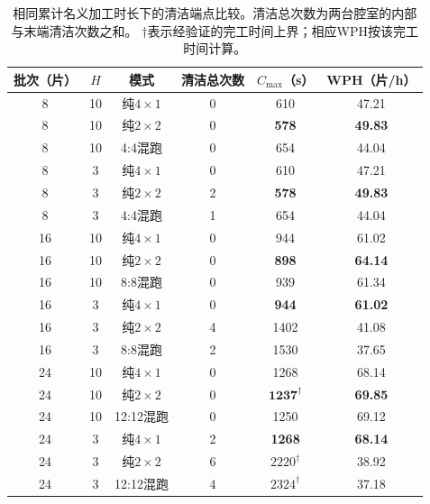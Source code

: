 \documentclass[final,5p,times,twocolumn]{elsarticle}
\begin{document}
\begin{table}[!htbp]
\centering
\scriptsize
\setlength{\tabcolsep}{4pt}
\caption{相同累计名义加工时长下的清洁端点比较。清洁总次数为两台腔室的内部与末端清洁次数之和。 $\dagger$表示经验证的完工时间上界；相应WPH按该完工时间计算。}
\label{tab:mode-extended-zh}
\begin{tabular}{cccccc}
\toprule
批次（片） & $H$ & 模式 & 清洁总次数 & $C_{\max}$（s） & WPH（片/h）\\
\midrule
8 & 10 & 纯$4\times1$ & 0 & 610 & 47.21\\
8 & 10 & 纯$2\times2$ & 0 & \textbf{578} & \textbf{49.83}\\
8 & 10 & 4:4混跑 & 0 & 654 & 44.04\\
8 & 3 & 纯$4\times1$ & 0 & 610 & 47.21\\
8 & 3 & 纯$2\times2$ & 2 & \textbf{578} & \textbf{49.83}\\
8 & 3 & 4:4混跑 & 1 & 654 & 44.04\\
\midrule
16 & 10 & 纯$4\times1$ & 0 & 944 & 61.02\\
16 & 10 & 纯$2\times2$ & 0 & \textbf{898} & \textbf{64.14}\\
16 & 10 & 8:8混跑 & 0 & 939 & 61.34\\
16 & 3 & 纯$4\times1$ & 0 & \textbf{944} & \textbf{61.02}\\
16 & 3 & 纯$2\times2$ & 4 & 1402 & 41.08\\
16 & 3 & 8:8混跑 & 2 & 1530 & 37.65\\
\midrule
24 & 10 & 纯$4\times1$ & 0 & 1268 & 68.14\\
24 & 10 & 纯$2\times2$ & 0 & $\mathbf{1237}^{\dagger}$ & \textbf{69.85}\\
24 & 10 & 12:12混跑 & 0 & 1250 & 69.12\\
24 & 3 & 纯$4\times1$ & 2 & \textbf{1268} & \textbf{68.14}\\
24 & 3 & 纯$2\times2$ & 6 & $2220^{\dagger}$ & 38.92\\
24 & 3 & 12:12混跑 & 4 & $2324^{\dagger}$ & 37.18\\
\bottomrule
\end{tabular}
\end{table}
\end{document}
